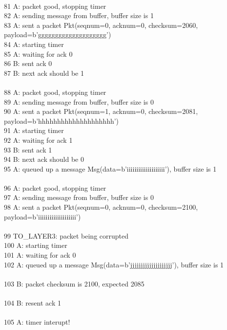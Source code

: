 \documentclass{article}
\begin{document}
{\\
81 A: packet good, stopping timer\\
82 A: sending message from buffer, buffer size is 1\\
83 A: sent a packet Pkt(seqnum=0, acknum=0, checksum=2060, payload=b'gggggggggggggggggggg')\\
84 A: starting timer\\
85 A: waiting for ack 0\\
86 B: sent ack 0\\
87 B: next ack should be 1\\
\\
88 A: packet good, stopping timer\\
89 A: sending message from buffer, buffer size is 0\\
90 A: sent a packet Pkt(seqnum=1, acknum=0, checksum=2081, payload=b'hhhhhhhhhhhhhhhhhhhh')\\
91 A: starting timer\\
92 A: waiting for ack 1\\
93 B: sent ack 1\\
94 B: next ack should be 0\\
95 A: queued up a message Msg(data=b'iiiiiiiiiiiiiiiiiiii'), buffer size is 1\\
\\
96 A: packet good, stopping timer\\
97 A: sending message from buffer, buffer size is 0\\
98 A: sent a packet Pkt(seqnum=0, acknum=0, checksum=2100, payload=b'iiiiiiiiiiiiiiiiiiii')\\
\\
99           \hspace*{10mm} TO\_LAYER3: packet being corrupted\\
100 A: starting timer\\
101 A: waiting for ack 0\\
102 A: queued up a message Msg(data=b'jjjjjjjjjjjjjjjjjjjj'), buffer size is 1\\
\\
103 B: packet checksum is 2100, expected 2085\\
\\
104 B: resent  ack 1\\
\\
105 A: timer interupt!\\
}
\end{document}
